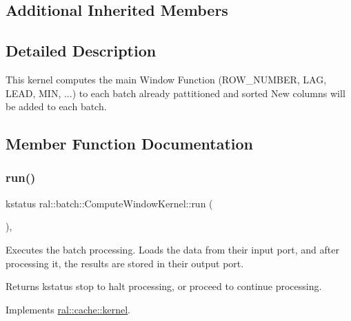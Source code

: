 \subsection*{Additional Inherited Members}


\subsection{Detailed Description}
This kernel computes the main Window Function (R\+O\+W\+\_\+\+N\+U\+M\+B\+ER, L\+AG, L\+E\+AD, M\+IN, ...) to each batch already pattitioned and sorted New columns will be added to each batch. 

\subsection{Member Function Documentation}
\mbox{\label{classral_1_1batch_1_1ComputeWindowKernel_a22a36fbcb21dad09bad9300e21dc4825}} 
\subsubsection{\texorpdfstring{run()}{run()}}
{\footnotesize\ttfamily kstatus ral\+::batch\+::\+Compute\+Window\+Kernel\+::run (\begin{DoxyParamCaption}{ }\end{DoxyParamCaption})\hspace{0.3cm}{\ttfamily [override]}, {\ttfamily [virtual]}}



Executes the batch processing. Loads the data from their input port, and after processing it, the results are stored in their output port. 

\begin{DoxyReturn}{Returns}
kstatus \textquotesingle{}stop\textquotesingle{} to halt processing, or \textquotesingle{}proceed\textquotesingle{} to continue processing. 
\end{DoxyReturn}


Implements \hyperlink{classral_1_1cache_1_1kernel_a735b081cccae9574924e74ea6d293ef7}{ral\+::cache\+::kernel}.

